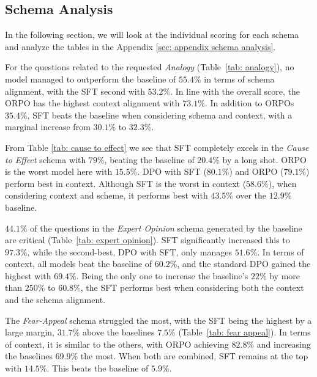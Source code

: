 \documentclass[11pt]{article}
\begin{document}
\subsection{Schema Analysis}
In the following section, we will look at the individual scoring for each schema and analyze the tables in the Appendix \ref{sec: appendix schema analysis}.

For the questions related to the requested \textit{Analogy} (Table~\ref{tab: analogy}), no model managed to outperform the baseline of $55.4\%$ in terms of schema alignment, with the SFT second with $53.2\%$. In line with the overall score, the ORPO has the highest context alignment with $73.1\%$. In addition to ORPOs $35.4\%$, SFT beats the baseline when considering schema and context, with a marginal increase from $30.1\%$ to $32.3\%$.

From Table \ref{tab: cause to effect} we see that SFT completely excels in the \textit{Cause to Effect} schema with $79\%$, beating the baseline of $20.4\%$ by a long shot. ORPO is the worst model here with $15.5\%$. DPO with SFT ($80.1\%$) and ORPO ($79.1\%$) perform best in context. Although SFT is the worst in context ($58.6\%$), when considering context and scheme, it performs best with $43.5\%$ over the $12.9\%$ baseline.

$44.1\%$ of the questions in the \textit{Expert Opinion} schema generated by the baseline are critical (Table~\ref{tab: expert opinion}). SFT significantly increased this to $97.3\%$, while the second-best, DPO with SFT, only manages $51.6\%$. In terms of context, all models beat the baseline of $60.2\%$, and the standard DPO gained the highest with $69.4\%$. Being the only one to increase the baseline's $22\%$ by more than $250\%$ to $60.8\%$, the SFT performs best when considering both the context and the schema alignment. 

The \textit{Fear-Appeal} schema struggled the most, with the SFT being the highest by a large margin, $31.7\%$ above the baselines $7.5\%$ (Table~\ref{tab: fear appeal}). In terms of context, it is similar to the others, with ORPO achieving $82.8\%$ and increasing the baselines $69.9\%$ the most. When both are combined, SFT remains at the top with $14.5\%$. This beats the baseline of $5.9\%$. 
\end{document}
